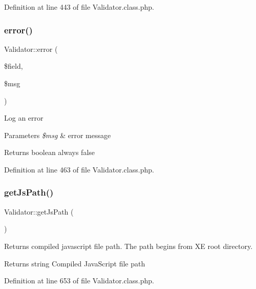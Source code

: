 Definition at line 443 of file Validator.\+class.\+php.

\hypertarget{classValidator_ad46fa003b320d64ef656b22de870782c}{}\label{classValidator_ad46fa003b320d64ef656b22de870782c} 
\subsubsection{\texorpdfstring{error()}{error()}}
{\footnotesize\ttfamily Validator\+::error (\begin{DoxyParamCaption}\item[{}]{\$field,  }\item[{}]{\$msg }\end{DoxyParamCaption})}

Log an error 
\begin{DoxyParams}{Parameters}
{\em \$msg} & error message \\
\hline
\end{DoxyParams}
\begin{DoxyReturn}{Returns}
boolean always false 
\end{DoxyReturn}


Definition at line 463 of file Validator.\+class.\+php.

\hypertarget{classValidator_ae9037d1911390583a1358b25c03768e3}{}\label{classValidator_ae9037d1911390583a1358b25c03768e3} 
\subsubsection{\texorpdfstring{get\+Js\+Path()}{getJsPath()}}
{\footnotesize\ttfamily Validator\+::get\+Js\+Path (\begin{DoxyParamCaption}{ }\end{DoxyParamCaption})}

Returns compiled javascript file path. The path begins from XE root directory. \begin{DoxyReturn}{Returns}
string Compiled Java\+Script file path 
\end{DoxyReturn}


Definition at line 653 of file Validator.\+class.\+php.

\hypertarget{classValidator_a3de1a1112e46b42ab6a89a4a13048504}{}\label{classValidator_a3de1a1112e46b42ab6a89a4a13048504} 
